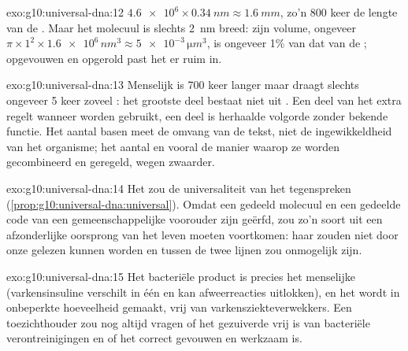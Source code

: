 \begin{solution}{exo:g10:universal-dna:12}
$\num{4.6e6} \times \qty{0.34}{nm} \approx \qty{1.6}{mm}$, zo'n 800 keer
de lengte van de . Maar het molecuul is slechts \qty{2}{nm} breed:
zijn volume, ongeveer $\pi \times 1^2 \times \num{1.6e6}\,
\unit{nm^3} \approx \num{5e-3}\,\unit{\micro m^3}$, is ongeveer 1\% van
dat van de ; opgevouwen en opgerold past het er ruim in.
\end{solution}

\begin{solution}{exo:g10:universal-dna:13}
Menselijk  is 700 keer langer maar draagt slechts ongeveer 5 keer
zoveel : het grootste deel bestaat niet uit . Een deel van het
extra  regelt wanneer  worden gebruikt, een deel is herhaalde
volgorde zonder bekende functie. Het aantal basen meet de omvang van de
tekst, niet de ingewikkeldheid van het organisme; het aantal  en
vooral de manier waarop ze worden gecombineerd en geregeld, wegen
zwaarder.
\end{solution}

\begin{solution}{exo:g10:universal-dna:14}
Het zou de universaliteit van het  tegenspreken
(\cref{prop:g10:universal-dna:universal}). Omdat een gedeeld molecuul en
een gedeelde code van een gemeenschappelijke voorouder zijn geërfd, zou
zo'n soort uit een afzonderlijke oorsprong van het leven moeten
voortkomen: haar  zouden niet door onze  gelezen kunnen
worden en  tussen de twee lijnen zou onmogelijk zijn.
\end{solution}

\begin{solution}{exo:g10:universal-dna:15}
Het bacteriële product is precies het menselijke 
(varkensinsuline verschilt in één  en kan afweerreacties
uitlokken), en het wordt in onbeperkte hoeveelheid gemaakt, vrij van
varkensziekteverwekkers. Een toezichthouder zou nog altijd vragen of het
gezuiverde  vrij is van bacteriële verontreinigingen en of het
correct gevouwen en werkzaam is.
\end{solution}

